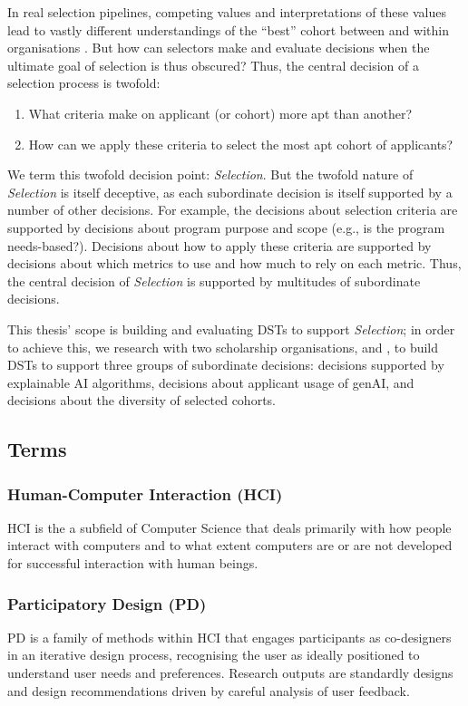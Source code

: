 In real selection pipelines, competing values and interpretations of these values lead to vastly different understandings of the ``best'' cohort between and within organisations \cite{zimmerman_research_2014}. But how can selectors make and evaluate decisions when the ultimate goal of selection is thus obscured? Thus, the central decision of a selection process is twofold: 

\begin{enumerate}
    \item What criteria make on applicant (or cohort) more apt than another?
    \item How can we apply these criteria to select the most apt cohort of applicants?
\end{enumerate}

We term this twofold decision point: \emph{Selection}. But the twofold nature of \emph{Selection} is itself deceptive, as each subordinate decision is itself supported by a number of other decisions. For example, the decisions about selection criteria are supported by decisions about program purpose and scope (e.g., is the program needs-based?). Decisions about how to apply these criteria are supported by decisions about which metrics to use and how much to rely on each metric. Thus, the central decision of \emph{Selection} is supported by multitudes of subordinate decisions. 

This thesis' scope is building and evaluating DSTs to support \emph{Selection}; in order to achieve this, we research with two scholarship organisations, \rise and \eit, to build DSTs to support three groups of subordinate decisions: decisions supported by explainable AI algorithms, decisions about applicant usage of genAI, and decisions about the diversity of selected cohorts.

\subsection{Terms}
\subsubsection{Human-Computer Interaction (HCI)}
HCI is the a subfield of Computer Science that deals primarily with how people interact with computers and to what extent computers are or are not developed for successful interaction with human beings.

\subsubsection{Participatory Design (PD)}
PD is a family of methods within HCI that engages participants as co-designers in an iterative design process, recognising the user as ideally positioned to understand user needs and preferences. Research outputs are standardly designs and design recommendations driven by careful analysis of user feedback.

